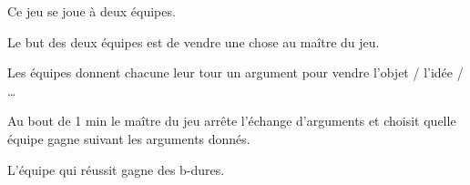 \documentclass{grand-jeu}
\begin{document}
\begin{regles}
Ce jeu se joue à deux équipes.

Le but des deux équipes est de vendre une chose au maître du jeu.

Les équipes donnent chacune leur tour un argument pour vendre l’objet / l’idée / …

Au bout de 1 min le maître du jeu arrête l’échange d’arguments et choisit quelle équipe gagne suivant les arguments donnés.

L'équipe qui réussit gagne des b-dures. 
\end{regles}

\begin{imaginaire}


\end{imaginaire}

\begin{moments-stop}
\end{moments-stop}
\end{document}
